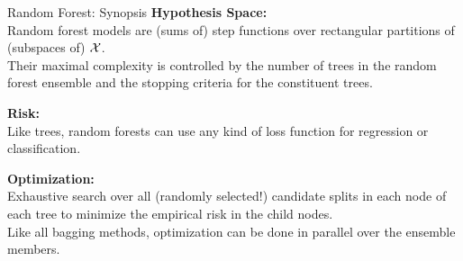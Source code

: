 \documentclass[11pt,compress,t,notes=noshow, xcolor=table]{beamer}
\begin{document}
\begin{vbframe}{Random Forest: Synopsis}
\textbf{Hypothesis Space:}\\
Random forest models are (sums of) step functions over rectangular partitions of (subspaces of) $\mathcal{X}$.\\
Their maximal complexity is controlled by the number of trees in the random forest ensemble and the stopping criteria for the constituent trees.

\lz

\textbf{Risk:}\\
Like trees, random forests can use any kind of loss function for regression or classification.

\lz

\textbf{Optimization:}\\
Exhaustive search over all (randomly selected!) candidate splits in each node of each tree to minimize the empirical risk in the child nodes.\\ 

{\small
Like all bagging methods, optimization can be done in parallel over the ensemble members.}

\end{vbframe}

\endlecture
\end{document}

